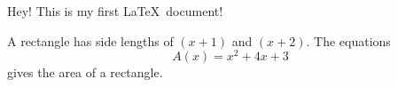 \documentclass[11pt]{article}
\begin{document}
Hey! This is my first \LaTeX\ document!

A rectangle has side lengths of $(x+1)$ and $(x+2)$.
The equations \[A(x)=x^2+4x+3\] gives the area of a rectangle.
\end{document}
